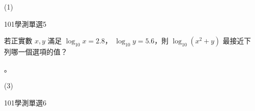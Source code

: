 \begin{QUESTIONS}
\begin{QUESTION}
\begin{QBODY}
        \end{QBODY}
        \begin{QFROMS}
        \end{QFROMS}
        \begin{QTAGS}\end{QTAGS}
        \begin{QANS}
            (1)
        \end{QANS}
        \begin{QSOLLIST}
        \end{QSOLLIST}
        \begin{QEMPTYSPACE}
        \end{QEMPTYSPACE}
    \end{QUESTION}
    \begin{QUESTION}
        \begin{ExamInfo}{101}{學測}{單選}{5}
        \end{ExamInfo}
        \begin{ExamAnsRateInfo}{51}{91}{46}{16}
        \end{ExamAnsRateInfo}
        \begin{QBODY}
			若正實數 $x, y$ 滿足 $\log_{10} x =2.8  $， $\log_{10} y = 5.6$，則 $\log_{10} ( x^2 + y)$ 最接近下列哪一個選項的值？
			\begin{QOPS} 
				 。
			\end{QOPS}
        \end{QBODY}
        \begin{QFROMS}
        \end{QFROMS}
        \begin{QTAGS}\end{QTAGS}
        \begin{QANS}
            (3)
        \end{QANS}
        \begin{QSOLLIST}
        \end{QSOLLIST}
        \begin{QEMPTYSPACE}
        \end{QEMPTYSPACE}
    \end{QUESTION}
    \begin{QUESTION}
        \begin{ExamInfo}{101}{學測}{單選}{6}

\end{ExamInfo}
\end{QUESTION}
\end{QUESTIONS}
